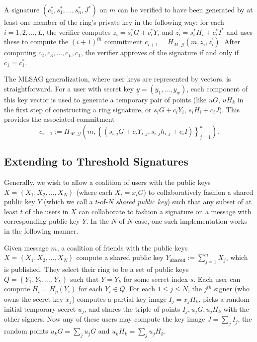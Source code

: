 \documentclass[12pt,english,oneside]{mrl}
\theoremstyle{definition}
\numberwithin{equation}{section}
\numberwithin{figure}{section}
\numberwithin{equation}{section}
\numberwithin{equation}{section}
\numberwithin{figure}{section}
\begin{document}
A signature $(c_1^*, s_1^*, \ldots, s_n^*, J^*)$ on $m$ can be verified to have been generated by at least one member of the ring's private key in the following way: for each $i=1,2,\ldots, L$, the verifier computes $z_{i} = s_i^* G + c_i^* Y_i$ and $z_{i}^{\prime} = s_i^* H_i + c_i^* I^*$ and uses these to compute the $(i+1)^{th}$ commitment $c_{i+1} = H_{\mathcal{M}, \mathcal{G}}(m, z_i, z^{\prime}_i)$. After computing $c_2, c_3, \ldots, c_L, c_1$, the verifier approves of the signature if and only if $c_1 = c_1^*$.

The MLSAG generalization, where user keys are represented by vectors, is straightforward. For a user with secret key $\underline{y}=(y_1,\ldots,y_w)$, each component of this key vector is used to generate a temporary pair of points (like $uG$, $uH_k$ in the first step of constructing a ring signature, or $s_i G + c_i Y_i$, $s_i H_i + c_i J$). This provides the associated commitment
\[c_{i+1}:=H_{\mathcal{M}, \mathcal{G}}\left(m,\left\{(s_{i,j} G + c_i Y_{i,j}, s_{i,j} h_{i,j} + c_i I)\right\}_{j=1}^{w}\right).\]



\subsection{Extending to Threshold Signatures} \label{naiveImplement}

Generally, we wish to allow a coalition of users with the public keys $X=\left\{X_{1}, X_{2}, \ldots, X_{N}\right\}$ (where each $X_i = x_iG$) to collaboratively fashion a shared public key $Y$ (which we call a $t$-of-$N$ \textit{shared public key}) such that any subset of at least $t$ of the users in $X$ can collaborate to fashion a signature on a message with corresponding public key $Y$. In the $N$-of-$N$ case, one such implementation works in the following manner. 

Given message $m$, a coalition of friends with the public keys $X=\left\{X_{1}, X_{2}, \ldots, X_{N}\right\}$  compute a shared public key $Y_{\texttt{shared}} := \sum_{j=1}^{n} X_j$, which is published. They select their ring to be a set of public keys $Q = \left\{Y_1, Y_2, \ldots, Y_L\right\}$ such that $Y = Y_{k}$ for some secret index $s$. Each user can compute $H_i = H_{p}(Y_i)$ for each $Y_i \in Q$. For each $1 \leq j \leq N$, the $j^{th}$ signer (who owns the secret key $x_{j}$) computes a partial key image $I_j = x_j H_{k}$, picks a random initial temporary secret $u_j$, and shares the triple of points $I_j, u_j G, u_j H_{k}$ with the other signers. Now any of these users may compute the key image $J = \sum_j I_j$, the random points $u_{k} G = \sum_j u_{j} G$ and $u_{k} H_{k}= \sum_j u_{j} H_{k}$. 
\end{document}
